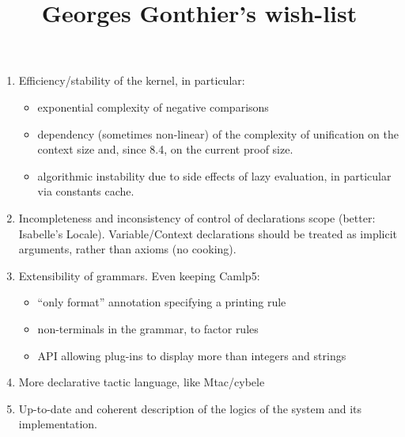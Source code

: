 \documentclass{beamer}
\begin{document}
\title{Georges Gonthier's wish-list}

\begin{frame}
\begin{enumerate}
\item Efficiency/stability of the kernel, in particular:
  \begin{itemize}
  \item exponential complexity of negative comparisons
  \item dependency (sometimes non-linear) of the complexity of unification on the
    context size and, since 8.4, on the current proof size.
  \item algorithmic instability due to side effects of lazy evaluation, in
    particular via constants cache.
  \end{itemize}
\item Incompleteness and inconsistency of control of declarations
  scope (better: Isabelle's Locale). Variable/Context declarations should be treated as implicit arguments,
  rather than axioms (no cooking).
\item Extensibility of grammars. Even keeping Camlp5:
\begin{itemize}
  \item ``only format'' annotation specifying a printing rule
  \item non-terminals in the grammar, to factor rules
  \item API allowing plug-ins to display more than integers and strings
\end{itemize}
\item More declarative tactic language, like Mtac/cybele
\item Up-to-date and coherent description of the logics of the system and its implementation.
\end{enumerate}
\end{frame}
\end{document}
